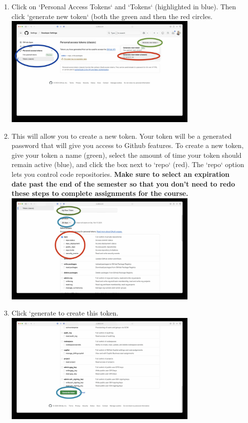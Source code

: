 \documentclass{article} %
\begin{document}
\begin{enumerate}
    \item Click on `Personal Access Tokens` and `Tokens` (highlighted in blue).  Then click `generate new token` (both the green and then the red circles.\\
    \includegraphics[width=0.75\textwidth]{figs/4createnew.jpg}

    \item This will allow you to create a new token.  Your token will be a generated password that will give you access to Github features.  To create a new token, give your token a name (green), select the amount of time your token should remain active (blue), and click the box next to `repo` (red).  The `repo` option lets you control code repositories.  \textbf{Make sure to select an expiration date past the end of the semester so that you don't need to redo these steps to complete assignments for the course.}\\
    \includegraphics[width=0.75\textwidth]{figs/5token.jpg}

    \item Click `generate to create this token.\\
    \includegraphics[width=0.75\textwidth]{figs/6generate.jpg}


\end{enumerate}
\end{document}
